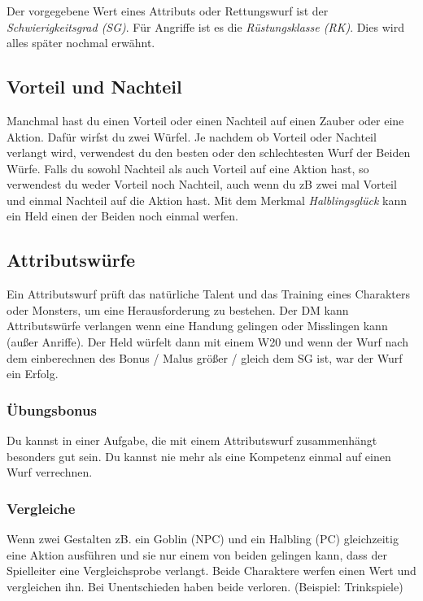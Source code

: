 \subsubsection*{}

\noindent Der vorgegebene Wert eines Attributs oder Rettungswurf ist der \textit{Schwierigkeitsgrad (SG)}. Für Angriffe ist es die \textit{Rüstungsklasse (RK)}. Dies wird alles später nochmal erwähnt.

\subsection{Vorteil und Nachteil}
Manchmal hast du einen Vorteil oder einen Nachteil auf einen Zauber oder eine Aktion. Dafür wirfst du zwei Würfel. Je nachdem ob Vorteil oder Nachteil verlangt wird, verwendest du den besten oder den schlechtesten Wurf der Beiden Würfe.
Falls du sowohl Nachteil als auch Vorteil auf eine Aktion hast, so verwendest du weder Vorteil noch Nachteil, auch wenn du zB zwei mal Vorteil und einmal Nachteil auf die Aktion hast. Mit dem Merkmal \textit{Halblingsglück} kann ein Held einen der Beiden noch einmal werfen.

\subsection{Attributswürfe}
Ein Attributswurf prüft das natürliche Talent und das Training eines Charakters oder Monsters, um eine Herausforderung zu bestehen.
Der DM kann Attributswürfe verlangen wenn eine Handung gelingen oder Misslingen kann (außer Anriffe).
Der Held würfelt dann mit einem W20 und wenn der Wurf nach dem einberechnen des Bonus / Malus größer / gleich dem SG ist, war der Wurf ein Erfolg.

\subsubsection{Übungsbonus}
Du kannst in einer Aufgabe, die mit einem Attributswurf zusammenhängt besonders gut sein. Du kannst nie mehr als eine Kompetenz einmal auf einen Wurf verrechnen.

\subsubsection{Vergleiche}
Wenn zwei Gestalten zB. ein Goblin (NPC) und ein Halbling (PC) gleichzeitig eine Aktion ausführen und sie nur einem von beiden gelingen kann, dass der Spielleiter eine Vergleichsprobe verlangt. Beide Charaktere werfen einen Wert und vergleichen ihn. Bei Unentschieden haben beide verloren. (Beispiel: Trinkspiele)

